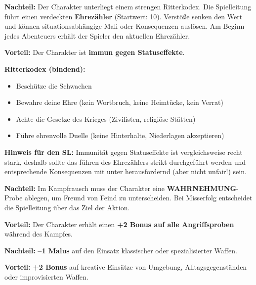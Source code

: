 \begin{traitbox}{}
	
	\textbf{Nachteil:}  
	Der Charakter unterliegt einem strengen Ritterkodex.
	Die Spielleitung führt einen verdeckten \textbf{Ehrezähler} (Startwert: 10).
	Verstöße senken den Wert und können situationsabhängige Mali oder Konsequenzen auslösen. Am Beginn jedes Abenteuers erhält der Spieler den aktuellen Ehrezähler. 
	
	\medskip
	\textbf{Vorteil:}  
	Der Charakter ist \textbf{immun gegen Statuseffekte}.
	
	\medskip
	\textbf{Ritterkodex (bindend):}
	\begin{itemize}
		\item Beschütze die Schwachen
		\item Bewahre deine Ehre (kein Wortbruch, keine Heimtücke, kein Verrat)
		\item Achte die Gesetze des Krieges (Zivilisten, religiöse Stätten)
		\item Führe ehrenvolle Duelle (keine Hinterhalte, Niederlagen akzeptieren)
	\end{itemize}
	
	\medskip
	\textbf{Hinweis für den SL:}
	Immunität gegen Statuseffekte ist vergleichsweise recht stark, deshalb sollte das führen des Ehrezählers strikt durchgeführt werden und entsprechende Konsequenzen mit unter herausfordernd (aber nicht unfair!) sein.
\end{traitbox}

\begin{traitbox}{}
	
	\textbf{Nachteil:}  
	Im Kampfrausch muss der Charakter eine \textbf{WAHRNEHMUNG}-Probe ablegen,
	um Freund von Feind zu unterscheiden.
	Bei Misserfolg entscheidet die Spielleitung über das Ziel der Aktion.
	
	\medskip
	\textbf{Vorteil:}  
	Der Charakter erhält einen \textbf{+2 Bonus auf alle Angriffsproben}
	während des Kampfes.
	
\end{traitbox}

\begin{traitbox}{}
	
	\textbf{Nachteil:}  
	\textbf{–1 Malus} auf den Einsatz klassischer oder spezialisierter Waffen.
	
	\medskip
	\textbf{Vorteil:}  
	\textbf{+2 Bonus} auf kreative Einsätze von
	Umgebung, Alltagsgegenständen oder improvisierten Waffen.
	
\end{traitbox}

